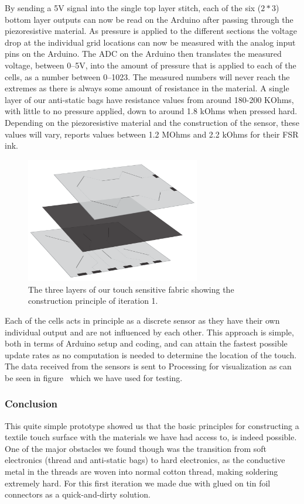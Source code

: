By sending a 5V signal into the single top layer stitch, each of the six (\(2*3\)) bottom layer outputs can now be read on the Arduino after passing through the piezoresistive material.  
As pressure is applied to the different sections the voltage drop at the individual grid locations can now be measured with the analog input pins on the Arduino.
The ADC on the Arduino then translates the measured voltage, between 0--5V, into the amount of pressure that is applied to each of the cells, as a number between 0--1023.
The measured numbers will never reach the extremes as there is always some amount of resistance in the material.
A single layer of our anti-static bags have resistance values from around 180-200 KOhms, with little to no pressure applied, down to around 1.8 kOhms when pressed hard.
Depending on the piezoresistive material and the construction of the sensor, these values will vary, \citep{rosenberg2009unmousepad} reports values between 1.2 MOhms and 2.2 kOhms for their FSR ink.

\begin{figure}[h]
	\centering
  		\includegraphics[width=3in]{figures/touch/layers_it_1}
	\caption[The three layers of our touch sensitive fabric, iteration 1.]
   {The three layers of our touch sensitive fabric showing the construction principle of iteration 1.}
   \label{layers_iteration1}
\end{figure}

Each of the cells acts in principle as a discrete sensor as they have their own individual output and are not influenced by each other.
This approach is simple, both in terms of Arduino setup and coding, and can attain the fastest possible update rates as no computation is needed to determine the location of the touch. 
The data received from the sensors is sent to Processing for visualization as can be seen in figure~ which we have used for testing.

\subsubsection{Conclusion}
This quite simple prototype showed us that the basic principles for constructing a textile touch surface with the materials we have had access to, is indeed possible.
One of the major obstacles we found though was the transition from soft electronics (thread and anti-static bags) to hard electronics, as the conductive metal in the threads are woven into normal cotton thread, making soldering extremely hard.
For this first iteration we made due with glued on tin foil connectors as a quick-and-dirty solution.

